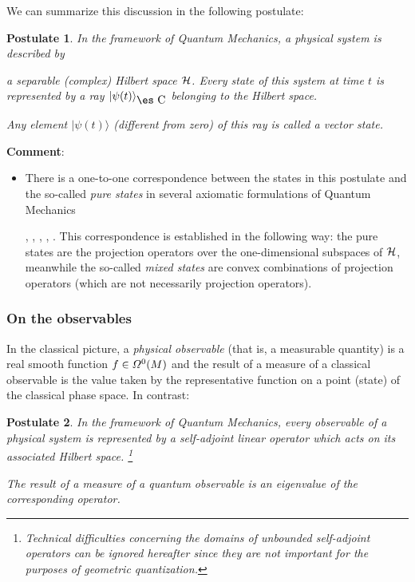 \documentclass[12pt]{article}
\newtheorem{post}{Postulate}
\def\H{{\cal H}}
\def\Complex{\mbox{\es C}}
\begin{document}
We can summarize this discussion in the following postulate:

\begin{post}
In the framework of Quantum Mechanics, a physical system is described by

a
{\it separable (complex) Hilbert space} $\H$.
Every state of this system at time $t$ is represented by a
{\it ray} $|\psi (t) \rangle_{\Complex}$ belonging to the Hilbert space.

Any element $|\psi (t) \rangle $ (different from zero) of this ray is
called a {\rm vector state}.
\label{pos1}
\end{post}
{\bf Comment}:
\begin{itemize}
\item
There is a one-to-one correspondence between
the states in this postulate and the so-called
{\it pure states} in several axiomatic formulations of Quantum Mechanics

\cite{Mk-mfqm}, \cite{Mo-qmdo}, \cite{Se-pgqm}, \cite{Vn-mfqm},
\cite{Wl-tgqm}.
This correspondence is established in the following way:
the pure states are the projection operators over the one-dimensional
subspaces of $\H$,
meanwhile the so-called {\it mixed states} are convex combinations of
projection operators
(which are not necessarily  projection operators).
\end{itemize}


\subsubsection{On the observables}


In the classical picture, a {\it physical observable}
(that is, a measurable quantity) is a real smooth function
$f \in {\mit\Omega}^0(M)$ and the result of
a measure of a classical observable is the value taken by the
representative
function on a point (state) of the classical phase space.
In contrast:

\begin{post}
In the framework of Quantum Mechanics,
every observable of a physical system is represented by a
{\it self-adjoint linear operator} which acts on its associated Hilbert
space.%
\footnote{
Technical difficulties concerning the domains of unbounded self-adjoint
operators
can be ignored hereafter since they are not important
for the purposes of geometric quantization.
}

The result of a measure of a quantum observable
is an eigenvalue of the corresponding operator.
\label{pos2}
\end{post}
\end{document}

